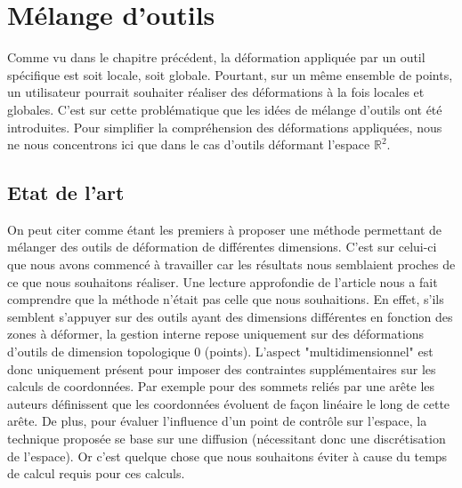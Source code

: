 
\chapter{Mélange d'outils}

\graphicspath{ {Chapter2/Chapter2Figs/PNG/}
  {Chapter2/Chapter2Figs/PDF/} {Chapter2/Chapter2Figs/} }

Comme vu dans le chapitre précédent, la déformation appliquée par un
outil spécifique est soit locale, soit globale. Pourtant, sur un même
ensemble de points, un utilisateur pourrait souhaiter réaliser des
déformations à la fois locales et globales. C'est sur cette
problématique que les idées de mélange d'outils ont été
introduites. Pour simplifier la compréhension des déformations
appliquées, nous ne nous concentrons ici que dans le cas d'outils
déformant l'espace $\mathbb{R}^2$.

\section{Etat de l'art}

On peut citer \cite{JBPS11} comme étant les premiers à proposer une
méthode permettant de mélanger des outils de déformation de
différentes dimensions. C'est sur celui-ci que nous avons commencé à
travailler car les résultats nous semblaient proches de ce que nous
souhaitons réaliser. Une lecture approfondie de l'article nous a fait
comprendre que la méthode n'était pas celle que nous souhaitions. En
effet, s'ils semblent s'appuyer sur des outils ayant des dimensions
différentes en fonction des zones à déformer, la gestion interne
repose uniquement sur des déformations d'outils de dimension
topologique 0 (points). L'aspect "multidimensionnel" est donc
uniquement présent pour imposer des contraintes supplémentaires sur
les calculs de coordonnées. Par exemple pour des sommets reliés par
une arête les auteurs définissent que les coordonnées évoluent de
façon linéaire le long de cette arête. De plus, pour évaluer
l'influence d'un point de contrôle sur l'espace, la technique proposée
se base sur une diffusion (nécessitant donc une discrétisation de
l'espace). Or c'est quelque chose que nous souhaitons éviter à cause
du temps de calcul requis pour ces calculs.
\\

